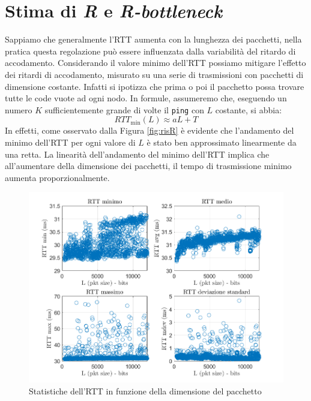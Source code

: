 \section{Stima di \textit{R} e \textit{R-bottleneck}}
Sappiamo che generalmente l'RTT aumenta con la lunghezza dei pacchetti, nella pratica questa regolazione può essere influenzata dalla variabilità del ritardo di accodamento. Considerando il valore minimo dell'RTT possiamo mitigare l'effetto dei ritardi di accodamento, misurato su una serie di trasmissioni con pacchetti di dimensione costante. Infatti si ipotizza che prima o poi il pacchetto possa trovare tutte le code vuote ad ogni nodo. In formule, assumeremo che, eseguendo un numero $K$ sufficientemente grande di volte il \texttt{ping} con $L$ costante, si abbia:
\begin{equation}
    RTT_{\min}(L)\approx aL+T
\end{equation}
In effetti, come osservato dalla Figura \ref{fig:risR} è evidente che l'andamento del minimo dell'RTT per ogni valore di $L$ è stato ben approssimato linearmente da una retta. La linearità dell'andamento del minimo dell'RTT implica che all'aumentare della dimensione dei pacchetti, il tempo di trasmissione minimo aumenta proporzionalmente.
\begin{figure}[H]
    \centering
    \includegraphics[width=\linewidth]{rtt all.png}
    \caption{Statistiche dell'RTT in funzione della dimensione del pacchetto}
    \label{fig:risRTT}
\end{figure}
